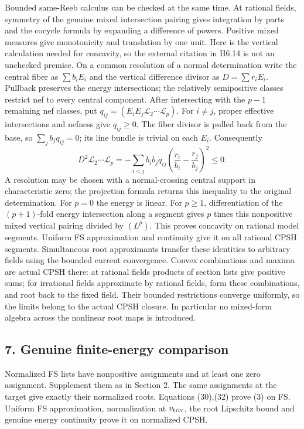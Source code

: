 \documentclass[
  10pt,
]{article}
\begin{document}
Bounded same-Reeb calculus can be checked at the same time. At rational
fields, symmetry of the genuine mixed intersection pairing gives
integration by parts and the cocycle formula by expanding a difference
of powers. Positive mixed measures give monotonicity and translation by
one unit. Here is the vertical calculation needed for concavity, so the
external citation in H6.14 is not an unchecked premise. On a common
resolution of a normal determination write the central fiber as
\(\sum b_iE_i\) and the vertical difference divisor as
\(D=\sum r_iE_i\). Pullback preserves the energy intersections; the
relatively semipositive classes restrict nef to every central component.
After intersecting with the \(p-1\) remaining nef classes, put
\(q_{ij}=(E_iE_j\mathcal L_2\cdots\mathcal L_p)\). For \(i\ne j\),
proper effective intersections and nefness give \(q_{ij}\geq0\). The
fiber divisor is pulled back from the base, so \(\sum_jb_jq_{ij}=0\);
its line bundle is trivial on each \(E_i\). Consequently
\[ D^2\mathcal L_2\cdots\mathcal L_p
 =-\sum_{i<j}b_ib_jq_{ij}\left(\frac{r_i}{b_i}-\frac{r_j}{b_j}\right)^2\leq0. \]
A resolution may be chosen with a normal-crossing central support in
characteristic zero; the projection formula returns this inequality to
the original determination. For \(p=0\) the energy is linear. For
\(p\geq1\), differentiation of the \((p+1)\)-fold energy intersection
along a segment gives \(p\) times this nonpositive mixed vertical
pairing divided by \((L^p)\). This proves concavity on rational model
segments. Uniform FS approximation and continuity give it on all
rational CPSH segments. Simultaneous root approximants transfer these
identities to arbitrary fields using the bounded current convergence.
Convex combinations and maxima are actual CPSH there: at rational fields
products of section lists give positive sums; for irrational fields
approximate by rational fields, form these combinations, and root back
to the fixed field. Their bounded restrictions converge uniformly, so
the limits belong to the actual CPSH closure. In particular no
mixed-form algebra across the nonlinear root maps is introduced.

\subsection{7. Genuine finite-energy
comparison}\label{genuine-finite-energy-comparison}

Normalized FS lists have nonpositive assignments and at least one zero
assignment. Supplement them as in Section 2. The same assignments at the
target give exactly their normalized roots. Equations (30),(32) prove
(3) on FS. Uniform FS approximation, normalization at \(v_{\rm triv}\),
the root Lipschitz bound and genuine energy continuity prove it on
normalized CPSH.
\end{document}
